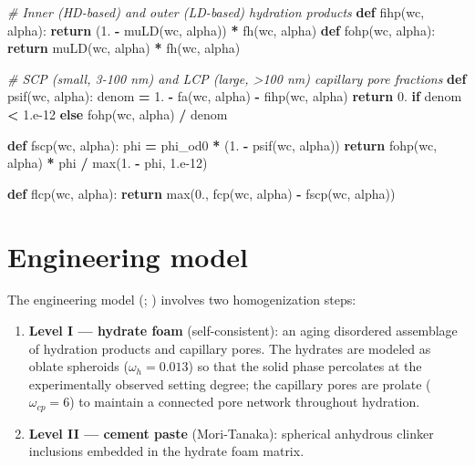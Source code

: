 \documentclass[
  a4paper,
  numbers=noendperiod,
  DIV=12]{scrreprt}
\newenvironment{Shaded}{\begin{snugshade}}{\end{snugshade}}
\newcommand{\BuiltInTok}[1]{#1}
\newcommand{\CommentTok}[1]{\textcolor[rgb]{0.56,0.35,0.01}{\textit{#1}}}
\newcommand{\ControlFlowTok}[1]{\textcolor[rgb]{0.13,0.29,0.53}{\textbf{#1}}}
\newcommand{\FloatTok}[1]{\textcolor[rgb]{0.00,0.00,0.81}{#1}}
\newcommand{\KeywordTok}[1]{\textcolor[rgb]{0.13,0.29,0.53}{\textbf{#1}}}
\newcommand{\NormalTok}[1]{#1}
\newcommand{\OperatorTok}[1]{\textcolor[rgb]{0.81,0.36,0.00}{\textbf{#1}}}
\providecommand{\tightlist}{%
  \setlength{\itemsep}{0pt}\setlength{\parskip}{0pt}}
\begin{document}
\begin{Shaded}
\begin{Highlighting}[]
\CommentTok{\# Inner (HD{-}based) and outer (LD{-}based) hydration products}
\KeywordTok{def}\NormalTok{ fihp(wc, alpha): }\ControlFlowTok{return}\NormalTok{ (}\FloatTok{1.} \OperatorTok{{-}}\NormalTok{ muLD(wc, alpha)) }\OperatorTok{*}\NormalTok{ fh(wc, alpha)}
\KeywordTok{def}\NormalTok{ fohp(wc, alpha): }\ControlFlowTok{return}\NormalTok{ muLD(wc, alpha) }\OperatorTok{*}\NormalTok{ fh(wc, alpha)}

\CommentTok{\# SCP (small, 3{-}100 nm) and LCP (large, \textgreater{}100 nm) capillary pore fractions}
\KeywordTok{def}\NormalTok{ psif(wc, alpha):}
\NormalTok{    denom }\OperatorTok{=} \FloatTok{1.} \OperatorTok{{-}}\NormalTok{ fa(wc, alpha) }\OperatorTok{{-}}\NormalTok{ fihp(wc, alpha)}
    \ControlFlowTok{return} \FloatTok{0.} \ControlFlowTok{if}\NormalTok{ denom }\OperatorTok{\textless{}} \FloatTok{1.e{-}12} \ControlFlowTok{else}\NormalTok{ fohp(wc, alpha) }\OperatorTok{/}\NormalTok{ denom}

\KeywordTok{def}\NormalTok{ fscp(wc, alpha):}
\NormalTok{    phi }\OperatorTok{=}\NormalTok{ phi\_od0 }\OperatorTok{*}\NormalTok{ (}\FloatTok{1.} \OperatorTok{{-}}\NormalTok{ psif(wc, alpha))}
    \ControlFlowTok{return}\NormalTok{ fohp(wc, alpha) }\OperatorTok{*}\NormalTok{ phi }\OperatorTok{/} \BuiltInTok{max}\NormalTok{(}\FloatTok{1.} \OperatorTok{{-}}\NormalTok{ phi, }\FloatTok{1.e{-}12}\NormalTok{)}

\KeywordTok{def}\NormalTok{ flcp(wc, alpha):}
    \ControlFlowTok{return} \BuiltInTok{max}\NormalTok{(}\FloatTok{0.}\NormalTok{, fcp(wc, alpha) }\OperatorTok{{-}}\NormalTok{ fscp(wc, alpha))}
\end{Highlighting}
\end{Shaded}

\section{Engineering model}\label{sec-cement-eng-model}

The engineering model (; ) involves
two homogenization steps:

\begin{enumerate}
\def\labelenumi{\arabic{enumi}.}
\tightlist
\item
  \textbf{Level I --- hydrate foam} (self-consistent): an aging
  disordered assemblage of hydration products and capillary pores. The
  hydrates are modeled as oblate spheroids (\(\omega_h = 0.013\)) so
  that the solid phase percolates at the experimentally observed setting
  degree; the capillary pores are prolate (\(\omega_{cp} = 6\)) to
  maintain a connected pore network throughout hydration.
\item
  \textbf{Level II --- cement paste} (Mori-Tanaka): spherical anhydrous
  clinker inclusions embedded in the hydrate foam matrix.
\end{enumerate}
\end{document}
